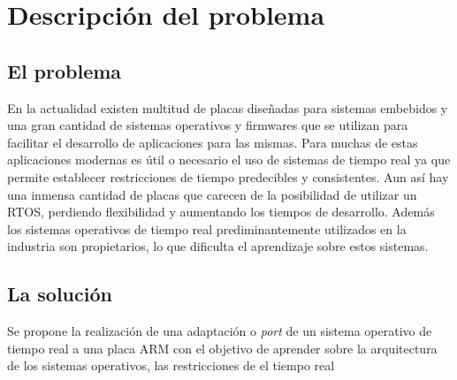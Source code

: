 \chapter{Descripción del problema}
\section{El problema}
En la actualidad existen multitud de placas diseñadas para sistemas embebidos y una gran cantidad de sistemas operativos y firmwares que se utilizan para facilitar el desarrollo de aplicaciones para las mismas.
Para muchas de estas aplicaciones modernas es útil o necesario el uso de sistemas de tiempo real ya que permite establecer restricciones de tiempo predecibles y consistentes.
Aun así hay una inmensa cantidad de placas que carecen de la posibilidad de utilizar un RTOS, perdiendo flexibilidad y aumentando los tiempos de desarrollo.
Además los sistemas operativos de tiempo real prediminantemente utilizados en la industria son propietarios, lo que dificulta el aprendizaje sobre estos sistemas.


\section{La solución}
Se propone la realización de una adaptación o \textit{port} de un sistema operativo de tiempo real a una placa ARM con el objetivo de aprender sobre la arquitectura de los sistemas operativos, las restricciones de el tiempo real 

\itemize
